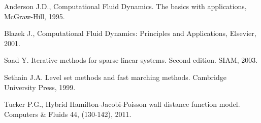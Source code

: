 \renewcommand\bibname{Bibliografia}	%
\begin{thebibliography}{4}

	Anderson J.D.,
	\textsf{Computational Fluid Dynamics. The basics with applications},
	McGraw-Hill,
	1995.
	
	Blazek J.,
	\textsf{Computational Fluid Dynamics: Principles and Applications},
	Elsevier,
	2001.
	
	Saad Y.
	\textsf{Iterative methods for sparse linear systems. Second edition.}
	SIAM,
	2003.
	
	Sethain J.A.
	\textsf{Level set methods and fast marching methods}.
	Cambridge University Press,
	1999.

	Tucker P.G.,
  	\textsf{Hybrid Hamilton-Jacobi-Poisson wall distance function model}.
  	Computers $\&$ Fluids 44,
  	(130-142),
  	2011.
  	
\end{thebibliography}


